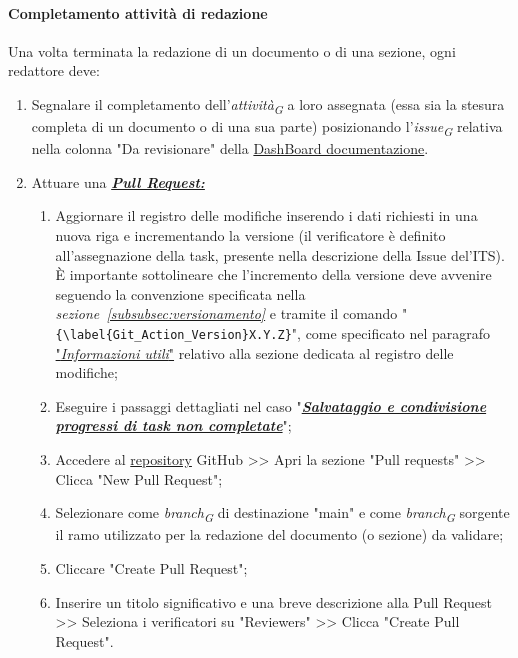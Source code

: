\paragraph*{\textbf{Completamento attività di redazione}}
Una volta terminata la redazione di un documento o di una sezione, ogni redattore deve:
\begin{enumerate}
    \item Segnalare il completamento dell'\textit{attività}\textsubscript{\textit{G}} a loro assegnata (essa sia la stesura completa di un documento o di una sua parte) posizionando l'\textit{issue}\textsubscript{\textit{G}} relativa nella colonna "Da revisionare" della \href{https://github.com/orgs/ByteOps-swe/projects/1/views/1}{DashBoard documentazione}.
    \item Attuare una \hyperlink{par:creazionePR}{\textit{\textbf{Pull Request:}}}
          \begin{enumerate}
              \item Aggiornare il registro delle modifiche inserendo i dati richiesti in una nuova riga e incrementando la versione (il verificatore è definito all'assegnazione della task, presente nella descrizione della Issue del'ITS).
              È importante sottolineare che l'incremento della versione deve avvenire seguendo la convenzione specificata nella \textit{sezione~\ref{subsubsec:versionamento}} e tramite il comando "\verb|{\label{Git_Action_Version}X.Y.Z}|", come specificato nel paragrafo \hyperlink{par:infoUtiliRegistroMod}{"\textit{Informazioni utili}"} relativo alla sezione dedicata al registro delle modifiche;
              \item Eseguire i passaggi dettagliati nel caso "\hyperlink{par:salvataggioecondivisioneprogressitasknoncompletate}{\textit{\textbf{Salvataggio e condivisione progressi di task non completate}}}";
              \item Accedere al \href{https://github.com/ByteOps-swe/Sorgente-documenti.git}{repository} GitHub >> Apri la sezione "Pull requests" >> Clicca "New Pull Request";
              \item Selezionare come \textit{branch}\textsubscript{\textit{G}} di destinazione "main" e come \textit{branch}\textsubscript{\textit{G}} sorgente il ramo utilizzato per la redazione del documento (o sezione) da validare;
              \item Cliccare "Create Pull Request";
              \item Inserire un titolo significativo e una breve descrizione alla Pull Request >> Seleziona i verificatori su "Reviewers" >> Clicca "Create Pull Request".
          \end{enumerate}
\end{enumerate}

